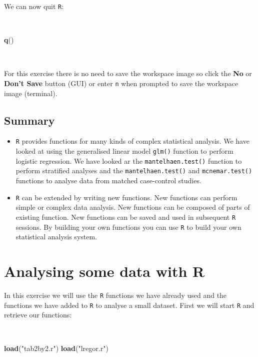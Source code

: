 \documentclass[12pt,a4paper]{book}
\newenvironment{Shaded}{\begin{snugshade}}{\end{snugshade}}
\newcommand{\KeywordTok}[1]{\textcolor[rgb]{0.13,0.29,0.53}{\textbf{#1}}}
\newcommand{\NormalTok}[1]{#1}
\newcommand{\StringTok}[1]{\textcolor[rgb]{0.31,0.60,0.02}{#1}}
\theoremstyle{definition}
\theoremstyle{definition}
\theoremstyle{definition}
\theoremstyle{remark}
\begin{document}
We can now quit \texttt{R}:

~

\begin{Shaded}
\begin{Highlighting}[]
\KeywordTok{q}\NormalTok{()}
\end{Highlighting}
\end{Shaded}

~

For this exercise there is no need to save the workspace image so click
the \textbf{No} or \textbf{Don't Save} button (GUI) or enter \texttt{n}
when prompted to save the workspace image (terminal).

\hypertarget{summary-2}{%
\section{Summary}\label{summary-2}}

\begin{itemize}
\item
  \texttt{R} provides functions for many kinds of complex statistical
  analysis. We have looked at using the generalised linear model
  \texttt{glm()} function to perform logistic regression. We have looked
  ar the \texttt{mantelhaen.test()} function to perform stratified
  analyses and the \texttt{mantelhaen.test()} and
  \texttt{mcnemar.test()} functions to analyse data from matched
  case-control studies.
\item
  \texttt{R} can be extended by writing new functions. New functions can
  perform simple or complex data analysis. New functions can be composed
  of parts of existing function. New functions can be saved and used in
  subsequent \texttt{R} sessions. By building your own functions you can
  use \texttt{R} to build your own statistical analysis system.
\end{itemize}

\hypertarget{exercise4}{%
\chapter{Analysing some data with R}\label{exercise4}}

In this exercise we will use the \texttt{R} functions we have already
used and the functions we have added to \texttt{R} to analyse a small
dataset. First we will start \texttt{R} and retrieve our functions:

~

\begin{Shaded}
\begin{Highlighting}[]
\KeywordTok{load}\NormalTok{(}\StringTok{"tab2by2.r"}\NormalTok{)}
\KeywordTok{load}\NormalTok{(}\StringTok{"lregor.r"}\NormalTok{)}
\end{Highlighting}
\end{Shaded}
\end{document}
